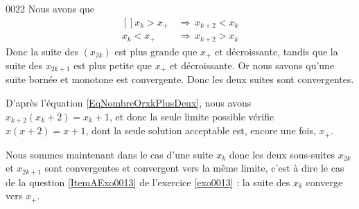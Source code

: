 \begin{corrige}{0022}
Nous avons que 
\begin{equation}
	\begin{aligned}[]
		x_k>x_+\,&\Rightarrow\,x_{k+2}<x_k\\
		x_k<x_+\,&\Rightarrow\,x_{k+2}>x_k
	\end{aligned}
\end{equation}
Donc la suite des $(x_{2k})$ est plus grande que $x_+$ et décroissante, tandis que la suite des $x_{2k+1}$ est plus petite que $x_+$ et décroissante. Or nous savons qu'une suite bornée et monotone est convergente. Donc les deux suites sont convergentes.

D'après l'équation \eqref{EqNombreOrxkPlusDeux}, nous avons $x_{k+2}(x_k+2)=x_k+1$, et donc la seule limite possible vérifie $x(x+2)=x+1$, dont la seule solution acceptable est, encore une fois, $x_+$.

Nous sommes maintenant dans le cas d'une suite $x_k$ donc les deux sous-suites $x_{2k}$ et $x_{2k+1}$ sont convergentes et convergent vers la même limite, c'est à dire le cas de la question \ref{ItemAExo0013} de l'exercice \ref{exo0013} : la suite des $x_k$ converge vers $x_+$.

\end{corrige}
